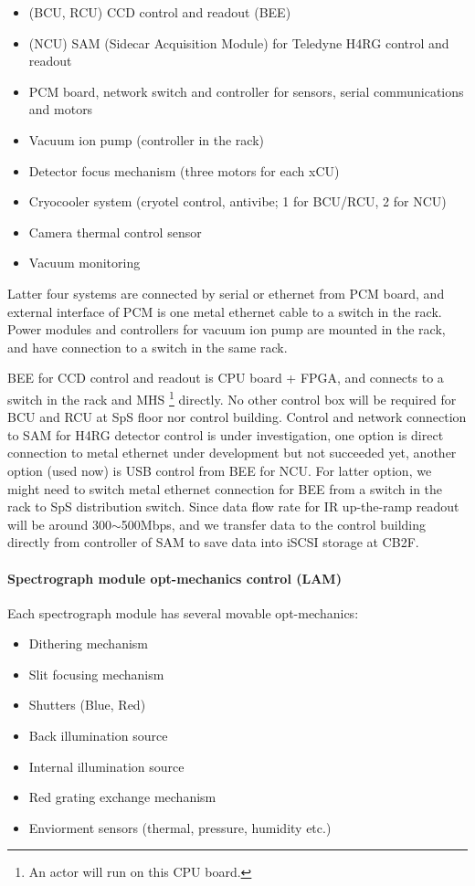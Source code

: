 \documentclass[a4paper,notitlepage]{article}
\begin{document}
\begin{itemize}
  \item (BCU, RCU) CCD control and readout (BEE)
  \item (NCU) SAM (Sidecar Acquisition Module) for Teledyne H4RG control and readout
  \item PCM board, network switch and controller for sensors, serial communications and motors
  \item Vacuum ion pump (controller in the rack)
  \item Detector focus mechanism (three motors for each xCU)
  \item Cryocooler system (cryotel control, antivibe; 1 for BCU/RCU, 2 for NCU)
  \item Camera thermal control sensor
  \item Vacuum monitoring
\end{itemize}

Latter four systems are connected by serial or ethernet from PCM board, 
and external interface of PCM is one metal ethernet cable to a switch in the 
rack. 
Power modules and controllers for vacuum ion pump are mounted in the rack, 
and have connection to a switch in the same rack. 

BEE for CCD control and readout is CPU board + FPGA, and connects to 
a switch in the rack and MHS \footnote{An actor will run on this CPU board.} 
directly. 
No other control box will be required for BCU and RCU at SpS floor nor 
control building. 
Control and network connection to SAM for H4RG detector control is under 
investigation, one option is direct connection to metal ethernet under 
development but not succeeded yet, another option (used now) is USB control 
from BEE for NCU. For latter option, we might need to switch metal ethernet 
connection for BEE from a switch in the rack to SpS distribution switch. 
Since data flow rate for IR up-the-ramp readout will be 
around 300$\sim$500Mbps, and we transfer data to the control building directly 
from controller of SAM to save data into iSCSI storage at CB2F. 



\paragraph{Spectrograph module opt-mechanics control (LAM)}

Each spectrograph module has several movable opt-mechanics: 

\begin{itemize}
  \item Dithering mechanism
  \item Slit focusing mechanism
  \item Shutters (Blue, Red)
  \item Back illumination source
  \item Internal illumination source
  \item Red grating exchange mechanism
  \item Enviorment sensors (thermal, pressure, humidity etc.)
\end{itemize}
\end{document}
